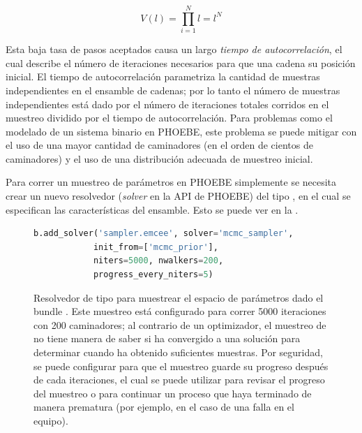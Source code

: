 \begin{eqfloat}[!ht]
	\centering
	\begin{equation}
		V(l) = \prod_{i = 1}^{N}{l} = l^N
	\end{equation}
\end{eqfloat}

Esta baja tasa de pasos aceptados causa un largo \textit{tiempo de
autocorrelación}, el cual describe el número de iteraciones necesarios para que
una cadena  su posición inicial. El tiempo de autocorrelación
parametriza la cantidad de muestras independientes en el ensamble de cadenas;
por lo tanto el número de muestras independientes está dado por el número de
iteraciones totales corridos en el muestreo dividido por el tiempo de
autocorrelación. Para problemas como el modelado de un sistema binario en
PHOEBE, este problema se puede mitigar con el uso de una mayor cantidad de
caminadores (en el orden de cientos de caminadores) y el uso de una distribución
adecuada de muestreo inicial.\

Para correr un muestreo de parámetros en PHOEBE simplemente se necesita crear un
nuevo resolvedor (\textit{solver} en la API de PHOEBE) del tipo , en
el cual se especifican las características del ensamble. Esto se puede ver en la
.

\begin{figure}[!ht]
	\centering
	\begin{lstlisting}[language=Python, autogobble]
		b.add_solver('sampler.emcee', solver='mcmc_sampler',
			init_from=['mcmc_prior'], 
			niters=5000, nwalkers=200, 
			progress_every_niters=5)
	\end{lstlisting}
	\caption{Resolvedor de tipo  para muestrear el espacio de
	parámetros dado el bundle . Este muestreo está configurado para
	correr 5000 iteraciones con 200 caminadores; al contrario de un optimizador,
	el muestreo de  no tiene manera de saber si ha convergido a una
	solución para determinar cuando ha obtenido suficientes muestras. Por
	seguridad, se puede configurar para que el muestreo guarde su progreso
	después de cada  iteraciones, el cual se puede
	utilizar para revisar el progreso del muestreo o para continuar un proceso
	que haya terminado de manera prematura (por ejemplo, en el caso de una falla
	en el equipo).}
	\label{codigoMuestreoMCMC}
\end{figure}

